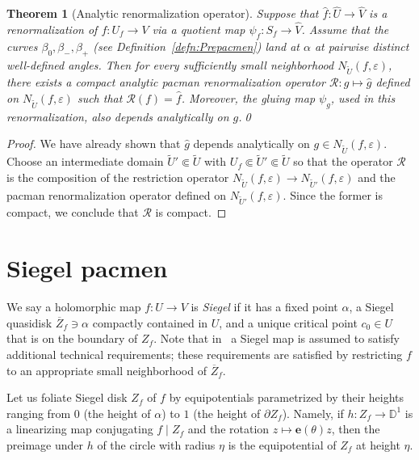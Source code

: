 \documentclass[]{amsart}
\newcommand\RR{\mathcal{R}}
\newcommand{\ee}{\mathbf e}
\newcommand{\Disk}{\mathbb{D}^1}
\newtheorem{thm}{Theorem}[section]
\theoremstyle{remark}
\numberwithin{equation}{section}
\theoremstyle{definition}
\begin{document}
\begin{thm}[Analytic renormalization operator]
\label{thm:RenOper}
Suppose that $\hat f:\widehat U\to  \widehat V $ is a renormalization of $f:U_f\to   V $ via a quotient map  $\psi_f:S_f\to \widehat V$. Assume that the curves $\beta_0, \beta_-,  \beta_+$ (see Definition~\ref{defn:Prepacmen}) land at $\alpha$ at pairwise distinct well-defined angles. Then for every sufficiently small neighborhood $N_{\widetilde U}(f,\varepsilon)$, %
there exists a compact analytic pacman renormalization operator $\mathcal{R}\colon g \mapsto \hat g$ defined on $  N_{\widetilde U}(f,\varepsilon) $ such that $\mathcal{R}(f)=\hat{f}$. Moreover, the gluing map $\psi_g$, used in this renormalization, also depends analytically on $g$.\qed
\end{thm}
\begin{proof}
We have already shown that $\hat g$ depends analytically on $g\in N_{\widetilde U}(f,\varepsilon)$. Choose an intermediate domain $\widetilde U'\Subset \widetilde U$ with $U_f \Subset \widetilde U' \Subset \widetilde U$ so that the operator $\RR$ is the composition of the restriction operator $ N_{\widetilde U}(f,\varepsilon)\to  N_{ \widetilde U'}(f,\varepsilon)$ and the pacman renormalization operator defined on $N_{ \widetilde U'}(f,\varepsilon)$. Since the former is compact, we conclude that $\RR$ is compact.
\end{proof}




\section{Siegel pacmen}
\label{s:SiegPacm}
We say a holomorphic map $f\colon U\to V$ is  \emph{Siegel} if it has a fixed point $\alpha$, a Siegel quasidisk $\overline Z_f\ni \alpha$ compactly contained in $U$, and a unique critical point $c_0\in U$ that is on the boundary of $ Z_f$. Note that in~\cite{AL-posmeas} a Siegel map is assumed to satisfy additional technical requirements; these requirements are satisfied by restricting $f$ to an appropriate small neighborhood of $\overline Z_f$. 


 Let us foliate Siegel disk $Z_{f}$ of $f$ by equipotentials parametrized by their heights ranging from $0$ (the height of $\alpha$) to $1$ (the height of $\partial Z_f$). Namely, if $h\colon Z_f\to \Disk$ is a linearizing map conjugating $f\mid Z_f$ and the rotation $z\mapsto \ee(\theta) z$, then the preimage under $h$ of the circle with radius $\eta$ is the equipotential of $Z_f$ at height $\eta$. 
 
\end{document}
